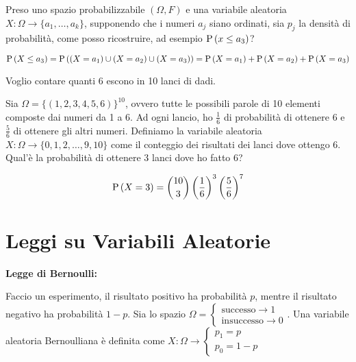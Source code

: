 \begin{defn}
	Preso uno spazio probabilizzabile $ (\Omega, F) $ e una variabile aleatoria $ X : \Omega \to \{ a_1, \dots, a_k \} $, supponendo che i numeri $ a_j $ siano ordinati, sia $ p_j $ la densità di probabilità, come posso ricostruire, ad esempio $ \text{P}\left(x \leq a_3\right) $?
	
	\begin{equation*}
		\text{P}\left(X \leq a_3\right) = \text{P}\left((X=a_1) \cup (X=a_2) \cup (X=a_3)\right) = \text{P}\left(X = a_1\right) + \text{P}\left(X = a_2\right) + \text{P}\left(X = a_3\right)
	\end{equation*}
	
\end{defn}

\begin{exmp}
	Voglio contare quanti 6 escono in 10 lanci di dadi.
	
	Sia $ \Omega = \{ (1, 2, 3, 4, 5, 6)\}^{10} $, ovvero tutte le possibili parole di 10 elementi composte dai numeri da 1 a 6. Ad ogni lancio, ho $ \frac{1}{6} $ di probabilità di ottenere 6 e $ \frac{5}{6} $ di ottenere gli altri numeri. Definiamo la variabile aleatoria $ X : \Omega \to \{ 0, 1, 2, \dots, 9, 10 \} $ come il conteggio dei risultati dei lanci dove ottengo 6. Qual'è la probabilità di ottenere 3 lanci dove ho fatto 6?
	
	\begin{equation*}
		\text{P}\left(X = 3\right) = \binom{10}{3} \left(\dfrac{1}{6}\right)^3 \left(\dfrac{5}{6}\right)^7 
	\end{equation*}
\end{exmp}

\section{Leggi su Variabili Aleatorie}

\begin{defn}
	\textbf{Legge di Bernoulli:}
\end{defn}
Faccio un esperimento, il risultato positivo ha probabilità $ p $, mentre il risultato negativo ha probabilità $ 1 - p $. Sia lo spazio $ \Omega = \begin{cases}
\text{successo} \to 1 \\
\text{insuccesso} \to 0
\end{cases} $. Una variabile aleatoria Bernoulliana è definita come $ X : \Omega \to \begin{cases}
p_1 = p \\ p_0 = 1 - p
\end{cases} $

